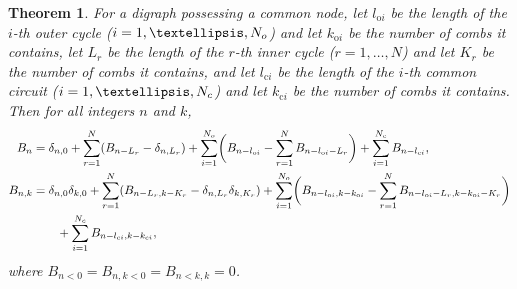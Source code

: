 \documentclass[preprint,3p]{elsarticle}
\newtheorem{thm}{Theorem}
\newcommand{\rb}[1]{_{\rm #1}} %
\begin{document}
\begin{thm}\label{T:CN}
For a digraph possessing a common node, let $l_{\mathrm{o}i}$ be the
length of the $i$-th outer cycle ($i=1,\ldots,N\rb{o}$) and
let $k_{\mathrm{o}i}$ be the number of combs it contains, let $L_r$ be
the length of the $r$-th inner cycle ($r=1,\ldots,N$) and let $K_r$ be the
number of combs it contains, and let $l_{\mathrm{c}i}$ be the length
of the $i$-th common circuit ($i=1,\ldots,N\rb{c}$) and
let $k_{\mathrm{c}i}$ be the number of combs it contains. Then for all
integers $n$ and $k$,
\begin{subequations}
\label{e:CN}
\begin{align} 
\label{e:CNBn}
B_n&=\delta_{n,0}+ 
\sum_{r=1}^N (B_{n-L_r}-\delta_{n,L_r})+
\sum_{i=1}^{N\rb{o}}
\biggl(B_{n-l_{\mathrm{o}i}}-\sum_{r=1}^NB_{n-l_{\mathrm{o}i}-L_r}\biggr)
+\sum_{i=1}^{N\rb{c}} B_{n-l_{\mathrm{c}i}},\\
\label{e:CNBnk}
B_{n,k}&=\delta_{n,0}\delta_{k,0}+ 
\sum_{r=1}^N (B_{n-L_r,k-K_r}-\delta_{n,L_r}\delta_{k,K_r})+
\sum_{i=1}^{N\rb{o}}
\biggl(B_{n-l_{\mathrm{o}i},k-k_{\mathrm{o}i}}
-\sum_{r=1}^NB_{n-l_{\mathrm{o}i}-L_r,k-k_{\mathrm{o}i}-K_r}\biggr)\nonumber\\
&\qquad\mbox{}+\sum_{i=1}^{N\rb{c}} B_{n-l_{\mathrm{c}i},k-k_{\mathrm{c}i}},
\end{align} 
\end{subequations}
where $B_{n<0}=B_{n,k<0}=B_{n<k,k}=0$. 
\end{thm}
\end{document}
